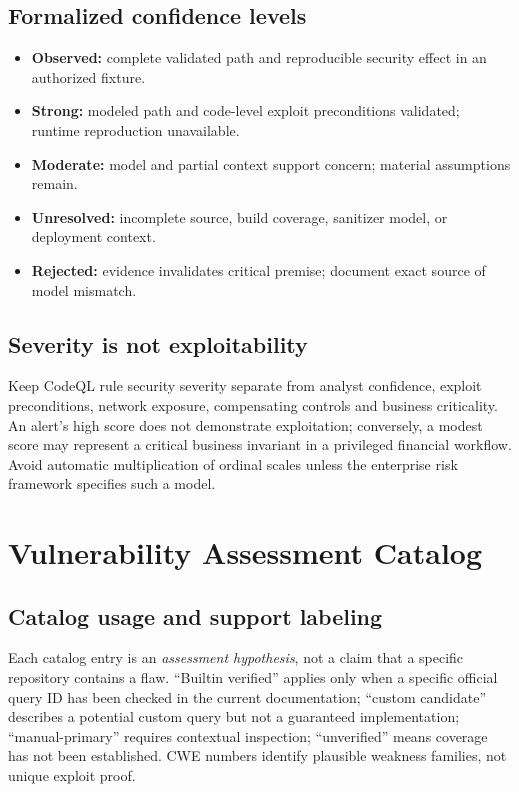 \documentclass[11pt,letterpaper,oneside]{book}
\begin{document}
\section{Formalized confidence levels}

\begin{itemize}
\item \textbf{Observed:} complete validated path and reproducible security effect in an authorized fixture.
\item \textbf{Strong:} modeled path and code-level exploit preconditions validated; runtime reproduction unavailable.
\item \textbf{Moderate:} model and partial context support concern; material assumptions remain.
\item \textbf{Unresolved:} incomplete source, build coverage, sanitizer model, or deployment context.
\item \textbf{Rejected:} evidence invalidates critical premise; document exact source of model mismatch.
\end{itemize}

\section{Severity is not exploitability}

Keep CodeQL rule security severity separate from analyst confidence, exploit preconditions, network exposure, compensating controls and business criticality. An alert's high score does not demonstrate exploitation; conversely, a modest score may represent a critical business invariant in a privileged financial workflow. Avoid automatic multiplication of ordinal scales unless the enterprise risk framework specifies such a model.

\chapter{Vulnerability Assessment Catalog}

\section{Catalog usage and support labeling}

Each catalog entry is an \emph{assessment hypothesis}, not a claim that a specific repository contains a flaw. ``Builtin verified'' applies only when a specific official query ID has been checked in the current documentation; ``custom candidate'' describes a potential custom query but not a guaranteed implementation; ``manual-primary'' requires contextual inspection; ``unverified'' means coverage has not been established. CWE numbers identify plausible weakness families, not unique exploit proof.
\end{document}
